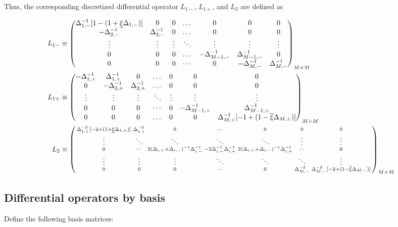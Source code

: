 \documentclass[11pt]{article}
\newenvironment{psmallmatrix}
{\left(\begin{smallmatrix}}
	{\end{smallmatrix}\right)}
\theoremstyle{definition}
\begin{document}
Thus, the corresponding discretized differential operator $L_{1-}$, $L_{1+}$, and $L_2$ are defined as 

\begin{align}
L_{1-} &\equiv \begin{pmatrix}
\Delta^{-1}_{1,-} [1 - (1 + \underline{\xi} \Delta_{1,-})] &0&0&\dots&0&0&0\\
-\Delta_{2,-}^{-1}&\Delta_{2,-}^{-1}&0&\dots&0&0&0\\
\vdots&\vdots&\vdots&\ddots&\vdots&\vdots&\vdots\\
0&0&0&\dots&-\Delta_{M-1,-}^{-1}&\Delta_{M-1,-}^{-1}&0\\
0&0&0&\cdots&0&-\Delta_{M,-}^{-1}&\Delta_{M,-}^{-1}
\end{pmatrix}_{M\times M}\label{eq:L-1} \\
L_{1+} &\equiv \begin{pmatrix}
-\Delta_{1,+}^{-1}&\Delta_{1,+}^{-1}&0&\dots&0&0&0\\
0&-\Delta_{2,+}^{-1}&\Delta_{2,+}^{-1}&\dots&0&0&0\\
\vdots&\vdots&\vdots&\ddots&\vdots&\vdots&\vdots\\
0&0&0&\cdots&0&-\Delta_{M-1,+}^{-1}&\Delta_{M-1,+}^{-1}\\
0&0&0&\dots&0&0&\Delta_{M,+}^{-1}  [-1 + (1 - \overline{\xi} \Delta_{M,+})]  \\
\end{pmatrix}_{M\times M}\label{eq:L-1-plus} \\
L_2 &\equiv \begin{psmallmatrix}
\Delta_{1,+}^{-2}[-2 + (1+\underline{\xi} \Delta_{1,+})] &\Delta_{1,+}^{-2}&0&\cdots&0&0&0 \\
\vdots&\ddots&\ddots&\ddots&\ddots&\vdots&\vdots\\
0&\cdots&2(\Delta_{i,+}+\Delta_{i,-})^{-1} \Delta_{i,-}^{-1} &-2\Delta_{i,-}^{-1} \Delta_{i,+}^{-1}  & 2 (\Delta_{i,+}+\Delta_{i,-})^{-1} \Delta_{i,+}^{-1}&\cdots&0 \\
\vdots&\vdots&\vdots&\ddots&\ddots&\ddots&\vdots\\
0&0&0&\cdots&0&\Delta_{M,-}^{-2}&\Delta_{M,-}^{-2} [-2 + (1- \overline{\xi}\Delta_{M,-})]
\end{psmallmatrix}_{M\times M}\label{eq:L-2}
\end{align}
\iffalse
\subsection{Differential operators by basis}
Define the following basis matrices:
\end{document}
